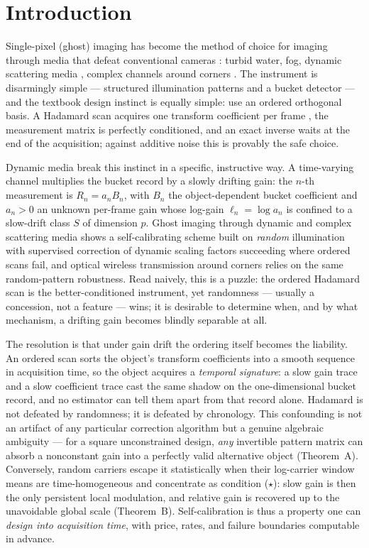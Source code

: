 \section{Introduction}

Single-pixel (ghost) imaging \cite{Pittman1995PRA,Bennink2002PRL,Shapiro2008PRA,Bromberg2009PRA} has become the method of choice for imaging through media that defeat conventional cameras \cite{Bina2013PRL,Cheng2009OE}: turbid water, fog, dynamic scattering media \cite{PengChen2024APL}, complex channels around corners \cite{PengXiaoChen2025OE}. The instrument is disarmingly simple --- structured illumination patterns and a bucket detector \cite{Duarte2008SPM,Edgar2019NatPhoton} --- and the textbook design instinct is equally simple: use an ordered orthogonal basis. A Hadamard scan acquires one transform coefficient per frame \cite{Zhang2017OE,Yu2019Sensors}, the measurement matrix is perfectly conditioned, and an exact inverse waits at the end of the acquisition; against additive noise this is provably the safe choice.

Dynamic media break this instinct in a specific, instructive way. A time-varying channel multiplies the bucket record by a slowly drifting gain: the $n$-th measurement is $R_n = a_n B_n$, with $B_n$ the object-dependent bucket coefficient and $a_n > 0$ an unknown per-frame gain whose log-gain $\ell_n = \log a_n$ is confined to a slow-drift class $S$ of dimension $p$. Ghost imaging through dynamic and complex scattering media \cite{PengChen2024APL} shows a self-calibrating scheme built on \emph{random} illumination with supervised correction of dynamic scaling factors succeeding where ordered scans fail, and optical wireless transmission around corners \cite{PengXiaoChen2025OE} relies on the same random-pattern robustness. Read naively, this is a puzzle: the ordered Hadamard scan is the better-conditioned instrument, yet randomness --- usually a concession, not a feature --- wins; it is desirable to determine when, and by what mechanism, a drifting gain becomes blindly separable at all.

The resolution is that under gain drift the ordering itself becomes the liability. An ordered scan sorts the object's transform coefficients into a smooth sequence in acquisition time, so the object acquires a \emph{temporal signature}: a slow gain trace and a slow coefficient trace cast the same shadow on the one-dimensional bucket record, and no estimator can tell them apart from that record alone. Hadamard is not defeated by randomness; it is defeated by chronology. This confounding is not an artifact of any particular correction algorithm but a genuine algebraic ambiguity --- for a square unconstrained design, \emph{any} invertible pattern matrix can absorb a nonconstant gain into a perfectly valid alternative object (Theorem~A). Conversely, random carriers escape it statistically when their log-carrier window means are time-homogeneous and concentrate as condition ($\star$): slow gain is then the only persistent local modulation, and relative gain is recovered up to the unavoidable global scale (Theorem~B). Self-calibration is thus a property one can \emph{design into acquisition time}, with price, rates, and failure boundaries computable in advance.


